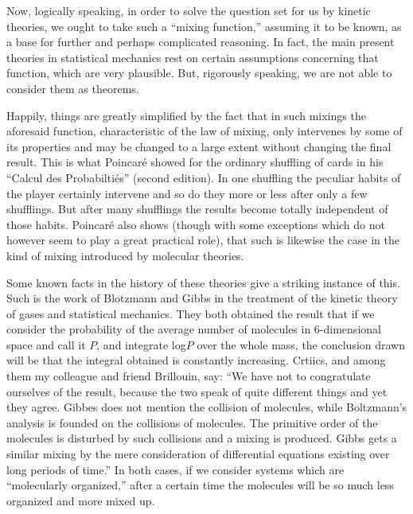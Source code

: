 \documentclass[12pt,oneside]{book}
\begin{document}
Now, logically speaking, in order to solve the question set for us by kinetic
theories, we ought to take such a ``mixing function,'' assuming it to be known,
as a base for further and perhaps complicated reasoning. In fact, the main
present theories in statistical mechanics rest on certain assumptions concerning
that function, which are very plausible. But, rigorously speaking, we are not
able to consider them as theorems. \par

Happily, things are greatly simplified by the fact that in such mixings the
aforesaid function, characteristic of the law of mixing, only intervenes by some
of its properties and may be changed to a large extent without changing the
final result. This is what Poincar\'e showed for the ordinary shuffling of cards
in his ``Calcul des Probabilti\'es'' (second edition). In one shuffling the
peculiar habits of the player certainly intervene and so do they more or less
after only a few shufflings. But after many shufflings the results become
totally independent of those habits. Poincar\'e also shows (though with some
exceptions which do not however seem to play a great practical role), that such
is likewise the case in the kind of mixing introduced by molecular theories. \par

Some known facts in the history of these theories give a striking instance of
this. Such is the work of Blotzmann and Gibbs in the treatment of the kinetic
theory of gases and statistical mechanics. They both obtained the result that if
we consider the probability of the average number of molecules in 6-dimensional
space and call it $P$, and integrate log$P$ over the whole mass, the conclusion
drawn will be that the integral obtained is constantly increasing. Crtiics, and
among them my colleague and friend Brillouin, say: ``We have not to
congratulate ourselves of the result, because the two speak of quite different
things and yet they agree. Gibbes does not mention the collision of molecules,
while Boltzmann's analysis is founded on the collisions of molecules. The
primitive order of the molecules is disturbed by such collisions and a mixing is
produced. Gibbs gets a similar mixing by the mere consideration of differential
equations existing over long periods of time.'' In both cases, if we consider
systems which are ``molecularly organized,'' after a certain time the molecules
will be so much less organized and more mixed up. \par
\end{document}
